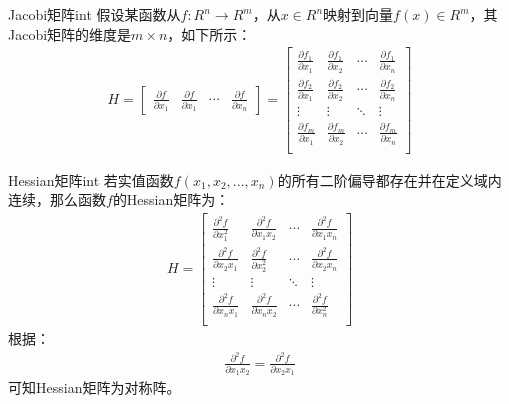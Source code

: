 \begin{definition}{\hypertarget{power}{Jacobi矩阵}}{int}
\label{def:jacobi}
假设某函数从$f:R^{n}\rightarrow R^{m}$，从$x\in{R^{n}}$映射到向量$f(x)\in{R^{m}}$，其Jacobi矩阵的维度是$m\times{n}$，如下所示：
\begin{align}
H = 
\begin{bmatrix}
\frac{\partial f}{\partial x_{1}} & \frac{\partial f}{\partial x_{1}} & \cdots & \frac{\partial f}{\partial x_{n}} 
\end{bmatrix}
 =
\begin{bmatrix}
\frac{\partial f_{1}}{\partial x_{1}}  & \frac{\partial f_{1}}{\partial x_{2}} & \cdots & \frac{\partial f_{1}}{\partial x_{n}} \\
\frac{\partial f_{2}}{\partial x_{1}}  & \frac{\partial f_{2}}{\partial x_{2}} & \cdots & \frac{\partial f_{2}}{\partial x_{n}} \\
\vdots        & \vdots        & \ddots    & \vdots \\
\frac{\partial f_{m}}{\partial x_{1}}  & \frac{\partial f_{m}}{\partial x_{2}} & \cdots & \frac{\partial f_{m}}{\partial x_{n}} \\
\end{bmatrix}
\end{align}
\end{definition}

\begin{definition}{\hypertarget{power}{Hessian矩阵}}{int}
\label{def:hessian}
若实值函数$f(x_1, x_2, ..., x_n)$的所有二阶偏导都存在并在定义域内连续，那么函数$f$的Hessian矩阵为：
\begin{align}
H = 
\begin{bmatrix}
\frac{\partial^{2}f}{\partial x_{1}^{2}}  & \frac{\partial^{2}f}{\partial x_{1}x_{2}} & \cdots & \frac{\partial^{2}f}{\partial x_{1}x_{n}} \\
\frac{\partial^{2}f}{\partial x_{2}x_{1}} & \frac{\partial^{2}f}{\partial x_{2}^{2}}  & \cdots & \frac{\partial^{2}f}{\partial x_{2}x_{n}} \\
\vdots        & \vdots        & \ddots    & \vdots \\
\frac{\partial^{2}f}{\partial x_{n}x_{1}} & \frac{\partial^{2}f}{\partial x_{n}x_{2}} & \cdots & \frac{\partial^{2}f}{\partial x_{n}^{2}} \\
\end{bmatrix}
\end{align}
根据：
\begin{align}
\frac{\partial^{2}f}{\partial x_{1}x_{2}}  = \frac{\partial^{2}f}{\partial x_{2}x_{1}} 
\end{align}
可知Hessian矩阵为对称阵。
\end{definition}
